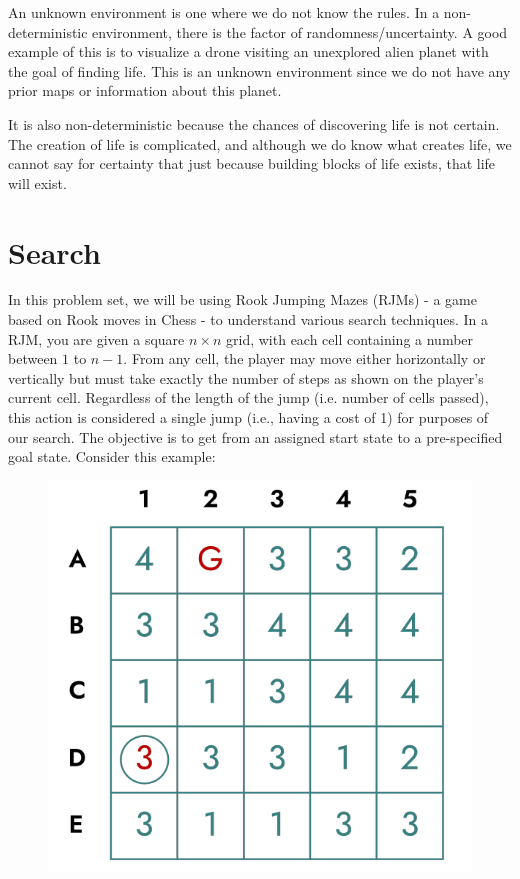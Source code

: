 \documentclass[a4paper]{article}
\begin{document}
\begin{sloppypar}
\begin{enumerate}[start=1,label=Q\arabic*,left=0pt]
    \par An unknown environment is one where we do not know the rules. In a non-deterministic environment, there is the factor of randomness/uncertainty. A good example
    of this is to visualize a drone visiting an unexplored alien planet with the goal of finding life. This is an unknown environment since we do not have any prior maps or information 
    about this planet. 
    
    It is also non-deterministic because the chances of discovering life is not certain. The creation of life is complicated,
    and although we do know what creates life, we cannot say for certainty that just because building blocks of life exists, that life will exist.

\end{enumerate}

\section{Search}

In this problem set, we will be using Rook Jumping Mazes (RJMs) - a game based on
Rook moves in Chess - to understand various search techniques. In a RJM, you are
given a square $n \times n$ grid, with each cell containing a number between $1$ to $n - 1$. From
any cell, the player may move either horizontally or vertically but must take exactly the
number of steps as shown on the player’s current cell. Regardless of the length of the
jump (i.e. number of cells passed), this action is considered a single jump (i.e., having a
cost of 1) for purposes of our search. The objective is to get from an assigned start state
to a pre-specified goal state. Consider this example:

\begin{figure}[H]
    \centering  
    \includegraphics[height=0.2\textheight]{Search_RJM.png}
    \label{fig:Search_RJM}
\end{figure}


\end{sloppypar}
\end{document}
